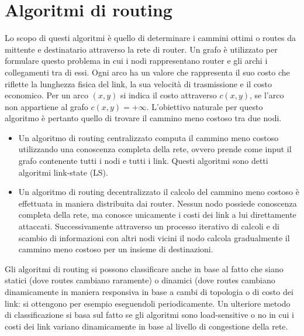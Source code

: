 \section{Algoritmi di routing}
Lo scopo di questi algoritmi \`e quello di determinare i cammini ottimi o routes da mittente e destinatario attraverso la rete di router. Un grafo \`e 
utilizzato per formulare questo problema in cui i nodi rappresentano router e gli archi i collegamenti tra di essi. Ogni arco ha un valore che rappresenta
il suo costo che riflette la lunghezza fisica del link, la sua velocit\`a di trasmissione e il costo economico. Per un arco $(x, y)$ si indica il costo 
attraverso $c(x, y)$, se l'arco non appartiene al grafo $c(x, y)=+\infty$. L'obiettivo naturale per questo algoritmo \`e pertanto quello di trovare il 
cammino meno costoso tra due nodi. 
\begin{itemize}
\item Un algoritmo di routing centralizzato computa il cammino meno costoso utilizzando una conoscenza completa della rete, ovvero prende come input il 
grafo contenente tutti i nodi e tutti i link. Questi algoritmi sono detti algoritmi link-state (LS).
\item Un algoritmo di routing decentralizzato il calcolo del cammino meno costoso \`e effettuata in maniera distribuita dai router. Nessun nodo possiede 
conoscenza completa della rete, ma conosce unicamente i costi dei link a lui direttamente attaccati. Successivamente attraverso un processo iterativo di 
calcoli e di scambio di informazioni con altri nodi vicini il nodo calcola gradualmente il cammino meno costoso per un insieme di destinazioni. 
\end{itemize}
Gli algoritmi di routing si possono classificare anche in base al fatto che siano statici (dove routes cambiano raramente) o dinamici (dove routes cambiano
dinamicamente in maniera responsiva in base a cambi di topologia o di costo dei link: si ottengono per esempio eseguendoli periodicamente. Un ulteriore 
metodo di classificazione si basa sul fatto se gli algoritmi sono load-sensitive o no in cui i costi dei link variano dinamicamente in base al livello di 
congestione della rete. 
